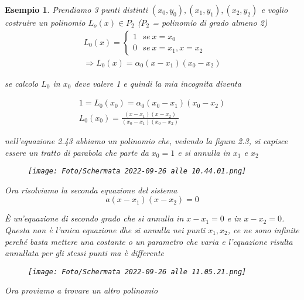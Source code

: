 \documentclass[a4paper, portrait]{book}
\numberwithin{equation}{chapter} %
\newtheorem{example}{Esempio}
\begin{document}
\begin{example}
    Prendiamo 3 punti distinti $(x_0, y_0), (x_1,y_1), (x_2,y_2)$ e voglio costruire un polinomio $L_o (x) \in P_2$ ($P_2$ = polinomio di grado almeno 2)
    \begin{gather}
        L_0(x) = \begin{cases} 1 \ \ \ se \ x = x_0\\
        0 \ \ \ se \ x = x_1, x = x_2
    \end{cases}\\
    \Rightarrow L_0(x) = \alpha_0 (x-x_1)(x_0 - x_2)
    \end{gather}
    \begin{center}
        se calcolo $L_0$ in $x_0$ deve valere 1 e quindi la mia incognita diventa
    \end{center}
    \begin{gather}
        1 = L_0(x_0) = \alpha_0 (x_0 - x_1)(x_0-x_2)\\
        L_0(x_0) = \frac{(x-x_1)(x-x_2)}{(x_0-x_1)(x_0-x_2)}
    \end{gather}
    \begin{center}
        nell'equazione 2.43 abbiamo un polinomio che, vedendo la figura 2.3, si capisce essere un tratto di parabola che parte da $x_0 = 1$ e si annulla in $x_1$ e $x_2$
        \begin{figure}[h!]
            \centering
            \texttt{[image: Foto/Schermata 2022-09-26 alle 10.44.01.png]}
            \caption{}
        \end{figure}
    \end{center}
    Ora risolviamo la seconda equazione del sistema
    \begin{equation}
        a (x-x_1)(x-x_2) = 0
    \end{equation}
    \begin{center}
        È un'equazione di secondo grado che si annulla in $x-x_1 = 0$ e in $x - x_2 = 0$. Questa non è l'unica equazione dhe si annulla nei punti $x_1,x_2$, ce ne sono infinite perché basta mettere una costante o un parametro che varia e l'equazione risulta annullata per gli stessi punti ma è differente
        \begin{figure}[h!]
            \centering
            \texttt{[image: Foto/Schermata 2022-09-26 alle 11.05.21.png]}
            \caption{}
        \end{figure}
    \end{center}
    \newpage
    Ora proviamo a trovare un altro polinomio

\end{example}
\end{document}
